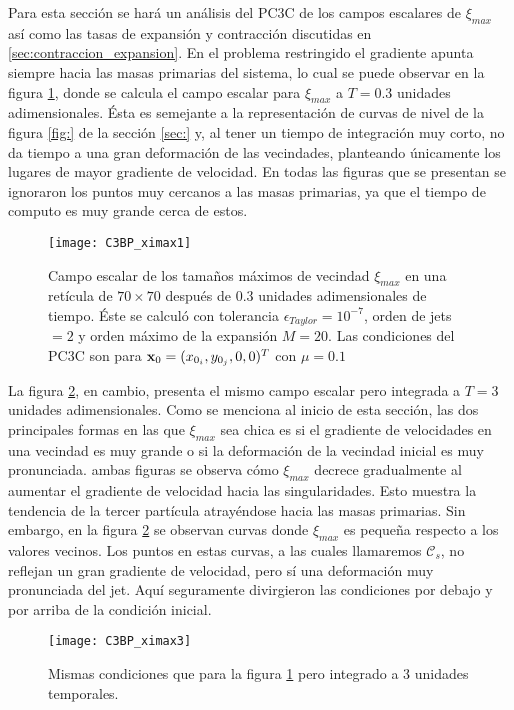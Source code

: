 Para esta sección se hará un análisis del PC3C de los campos escalares de $\xi_{max}$ así como las tasas de expansión y contracción discutidas en \ref{sec:contraccion_expansion}. En el problema restringido el gradiente apunta siempre hacia las masas primarias del sistema, lo cual se puede observar en la figura \ref{fig:C3BP_ximax1}, donde se calcula el campo escalar para $\xi_{max}$ a $T = 0.3$ unidades adimensionales. Ésta es semejante a la representación de curvas de nivel de la figura \ref{fig:} de la sección \ref{sec:} y, al tener un tiempo de integración muy corto, no da tiempo a una gran deformación de las vecindades, planteando únicamente los lugares de mayor gradiente de velocidad. En todas las figuras que se presentan se ignoraron los puntos muy cercanos a las masas primarias, ya que el tiempo de computo es muy grande cerca de estos. 

\begin{figure}
 \centering
 \texttt{[image: C3BP\_ximax1]}
 \caption{Campo escalar de los tamaños máximos de vecindad $\xi_{max}$ en una retícula de $70 \times 70$  después de $0.3$ unidades adimensionales de tiempo. Éste se calculó con tolerancia $\epsilon_{Taylor} = 10^{-7}$, orden de jets $ = 2$ y orden máximo de la expansión $M = 20$. Las condiciones del PC3C son para $\mathbf{x}_0 = (x_{0_i}, y_{0_j}, 0, 0)^T$ con $\mu = 0.1$}
 \label{fig:C3BP_ximax1}
\end{figure}

La figura \ref{fig:C3BP_ximax3}, en cambio, presenta el mismo campo escalar pero integrada a $T = 3$ unidades adimensionales. Como se menciona al inicio de esta sección, las dos principales formas en las que $\xi_{max}$ sea chica es si el gradiente de velocidades en una vecindad es muy grande o si la deformación de la vecindad inicial es muy pronunciada. ambas figuras se observa cómo $\xi_{max}$ decrece gradualmente al aumentar el gradiente de velocidad hacia las singularidades. Esto muestra la tendencia de la tercer partícula atrayéndose hacia las masas primarias. Sin embargo, en la figura \ref{fig:C3BP_ximax3} se observan curvas donde $\xi_{max}$ es pequeña  respecto a los valores vecinos. Los puntos en estas curvas, a las cuales llamaremos $\mathcal{C}_s$, no reflejan un gran gradiente de velocidad, pero sí una deformación muy pronunciada del jet. Aquí seguramente divirgieron las condiciones por debajo y por arriba de la condición inicial. 

\begin{figure}
 \centering
 \texttt{[image: C3BP\_ximax3]}
 \caption{Mismas condiciones que para la figura \ref{fig:C3BP_ximax1} pero integrado a $3$ unidades temporales.}
 \label{fig:C3BP_ximax3}
\end{figure}

